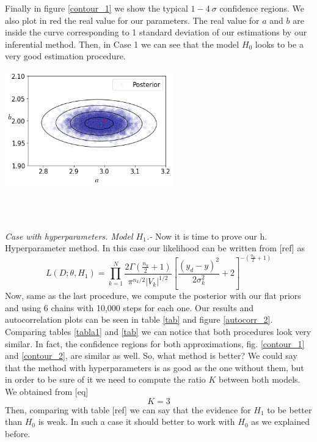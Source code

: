 \documentclass[onecolumn,           %
               showpacs,            %
               preprintnumbers,     %
               aps,                 %
               prl,          	    %
               letterpaper,             %
               superscriptaddress,      %
               nofootinbib,         %
               tightenlines,        %
               floats,floatfix      %
               ,usenatbib,
               ]{revtex4-1}
\begin{document}
Finally in figure \ref{contour_1} we show the typical $1-4\ \sigma$ confidence regions. We also plot in red the real value for our parameters. The real value for $a$ and $b$ are inside the curve corresponding to 1 standard deviation of our estimations by our inferential method. Then, in Case 1 we can see that the model $H_0$ looks to be a very good estimation procedure.

\begin{minipage}{\textwidth}
\centering
\includegraphics[height=5cm]{Figures/contour_1.png}
\label{contour_1}
\end{minipage}\\ $ $

\textit{Case with hyperparameters. Model $H_1$.-} Now it is time to prove our h. Hyperparameter method. In this case our likelihood can be written from [ref] as
\begin{equation}
L(D;\theta,H_1)=\prod_{k=1}^N\frac{2\Gamma(\frac{n_k}{2}+1)}{\pi^{n_k/2}|V_k|^{1/2}}\left[\frac{(y_d-y)^2}{2\sigma_k^2}+2\right]^{-\left(\frac{n_k}{2}+1\right)}
\end{equation}
Now, same as the last procedure, we compute the posterior with our flat priors and using 6 chains with 10,000 steps for each one. Our results and autocorrelation plots can be seen in table \ref{tab} and figure \ref{autocorr_2}. Comparing tables \ref{tabla1} and \ref{tab} we can notice that both procedures look very similar. In fact, the confidence regions for both approximations, fig. \ref{contour_1} and \ref{contour_2}, are similar as well. So, what method is better? We could say that the method with hyperparameters is as good as the one without them, but in order to be sure of it we need to compute the ratio $K$ between both models. We obtained from [eq] 
\begin{equation}
K = 3
\end{equation}
Then, comparing with table [ref] we can say that the evidence for $H_1$ to be better than $H_0$ is weak. In such a case it should better to work with $H_0$ as we explained before.
\end{document}
